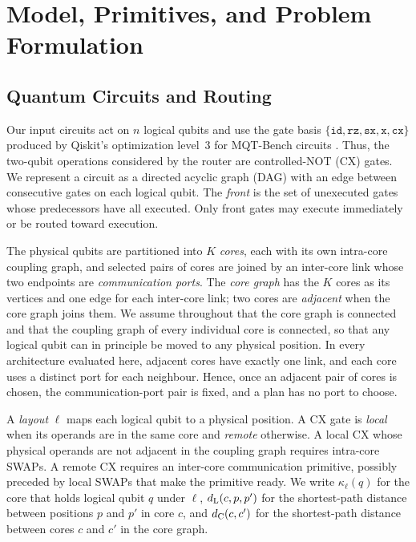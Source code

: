 \section{Model, Primitives, and Problem Formulation}
\label{sec:background}

\subsection{Quantum Circuits and Routing}
\label{sec:qcircuits}

Our input circuits act on $n$ logical qubits and use the gate basis
$\{\texttt{id},\texttt{rz},\texttt{sx},\texttt{x},\texttt{cx}\}$ produced
by Qiskit's optimization level~3 for MQT-Bench circuits
\cite{quetschlich2023mqtbench}. Thus, the two-qubit operations considered
by the router are controlled-NOT (CX) gates. We represent a circuit as a
directed acyclic graph (DAG) with an edge between consecutive gates on
each logical qubit. The \emph{front} is the set of unexecuted gates whose
predecessors have all executed. Only front gates may execute immediately or
be routed toward execution.

The physical qubits are partitioned into $K$ \emph{cores}, each with its own
intra-core coupling graph, and selected pairs of cores are joined by an
inter-core link whose two endpoints are \emph{communication ports}. The
\emph{core graph} has the $K$ cores as its vertices and one edge for each
inter-core link; two cores are \emph{adjacent} when the core graph joins
them. We assume throughout that the core graph is connected and that the
coupling graph of every individual core is connected, so that any logical
qubit can in principle be moved to any physical position. In every
architecture evaluated here, adjacent cores have exactly one link, and each
core uses a distinct port for each neighbour. Hence, once an adjacent pair
of cores is chosen, the communication-port pair is fixed, and a
plan has no port to choose.

A \emph{layout} $\ell$ maps each logical qubit to a physical position. A
CX gate is \emph{local} when its operands are in the same core and
\emph{remote} otherwise. A local CX whose physical operands are not
adjacent in the coupling graph requires intra-core SWAPs. A remote CX
requires an inter-core communication primitive, possibly preceded by local
SWAPs that make the primitive ready. We write $\kappa_\ell(q)$ for the core
that holds logical qubit $q$ under $\ell$, $d_{\mathrm{L}}(c,p,p')$ for the shortest-path distance between positions $p$ and $p'$ in core $c$, and $d_{\mathrm{C}}(c,c')$
for the shortest-path distance between cores $c$ and $c'$ in the core graph.


